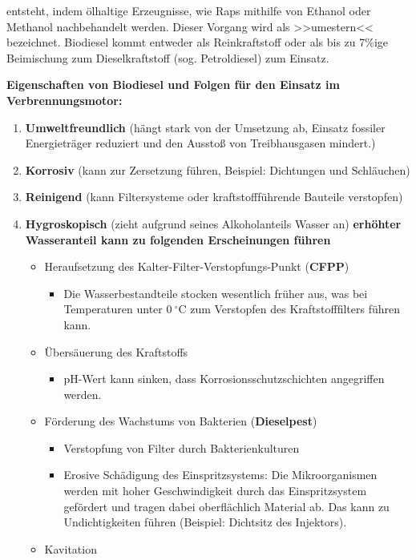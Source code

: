 entsteht, indem ölhaltige Erzeugnisse, wie Raps mithilfe von Ethanol
oder Methanol nachbehandelt werden. Dieser Vorgang wird als >>umestern<<
bezeichnet. Biodiesel kommt entweder als Reinkraftstoff oder als bis zu
7\%ige Beimischung zum Dieselkraftstoff (sog. Petroldiesel) zum Einsatz.

\textbf{Eigenschaften von Biodiesel und Folgen für den Einsatz im
Verbrennungsmotor:}

\begin{enumerate}
\item
  \textbf{Umweltfreundlich} (hängt stark von der Umsetzung ab, Einsatz
  fossiler Energieträger reduziert und den Ausstoß von Treibhausgasen
  mindert.)
\item
  \textbf{Korrosiv} (kann zur Zersetzung führen, Beispiel: Dichtungen
  und Schläuchen)
\item
  \textbf{Reinigend} (kann Filtersysteme oder kraftstoffführende
  Bauteile verstopfen)
\item
  \textbf{Hygroskopisch} (zieht aufgrund seines Alkoholanteils Wasser
  an) \textbf{erhöhter Wasseranteil kann zu folgenden Erscheinungen
  führen}

  \begin{itemize}
  \item
    Heraufsetzung des Kalter-Filter-Verstopfungs-Punkt (\textbf{CFPP})

    \begin{itemize}
    \item
      Die Wasserbestandteile stocken wesentlich früher aus, was bei
      Temperaturen unter $0~^\circ\text{C}$ zum Verstopfen des
      Kraftstofffilters führen kann.
    \end{itemize}
  \item
    Übersäuerung des Kraftstoffs

    \begin{itemize}
    \item
      pH-Wert kann sinken, dass Korrosionsschutzschichten angegriffen
      werden.
    \end{itemize}
  \item
    Förderung des Wachstums von Bakterien (\textbf{Dieselpest})

    \begin{itemize}
    \item
      Verstopfung von Filter durch Bakterienkulturen
    \item
      Erosive Schädigung des Einspritzsystems: Die Mikroorganismen
      werden mit hoher Geschwindigkeit durch das Einspritzsystem
      gefördert und tragen dabei oberflächlich Material ab. Das kann zu
      Undichtigkeiten führen (Beispiel: Dichtsitz des Injektors).
    \end{itemize}
  \item
    Kavitation


\end{itemize}
\end{enumerate}
